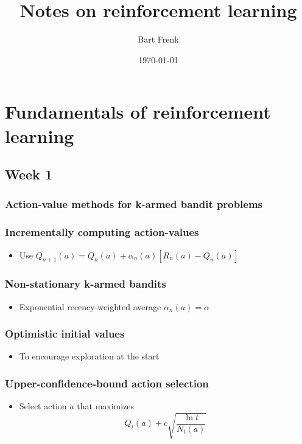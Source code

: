 \documentclass[11pt]{article}
\author{Bart Frenk}
\date{\today}
\title{Notes on reinforcement learning}
\begin{document}
\maketitle
\tableofcontents


\section{Fundamentals of reinforcement learning}
\label{sec:org5a63358}
\subsection{Week 1}
\label{sec:orgb00a6ba}
\subsubsection{Action-value methods for k-armed bandit problems}
\label{sec:orgb01f3ba}
\subsubsection{Incrementally computing action-values}
\label{sec:org8b686ae}
\begin{itemize}
\item Use \(Q_{n+1}(a) = Q_n(a) + \alpha_n(a) [R_n(a) - Q_n(a)]\)
\end{itemize}

\subsubsection{Non-stationary k-armed bandits}
\label{sec:org38be267}
\begin{itemize}
\item Exponential recency-weighted average \(\alpha_n(a) = \alpha\)
\end{itemize}
\subsubsection{Optimistic initial values}
\label{sec:org34450b5}
\begin{itemize}
\item To encourage exploration at the start
\end{itemize}
\subsubsection{Upper-confidence-bound action selection}
\label{sec:org2e5f11c}
\begin{itemize}
\item Select action \(a\) that maximizes
$$
     Q_t(a) + c \sqrt{\frac{\ln t}{N_t(a)}}
  $$
\end{itemize}
\end{document}
